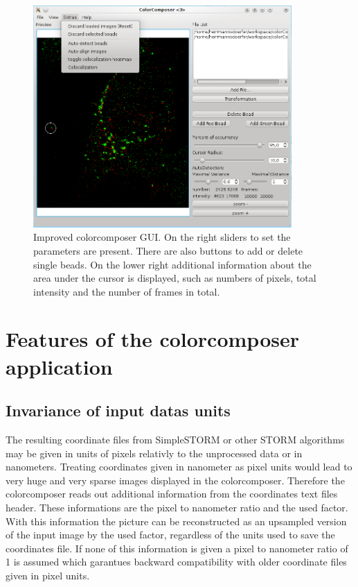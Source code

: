 \begin{figure}
\centering
\includegraphics[width = 0.88\textwidth]{pictures/GuiColorcomposer/BeforeAlignmentWithMenu.png}
\caption{Improved colorcomposer GUI. On the right sliders to set the parameters are present. There are also buttons to add or delete single beads. On the lower right additional information about the area under the cursor is displayed, such as numbers of pixels, total intensity and the number of frames in total.}
\label{ColorComposer}
\end{figure}


\section{Features of the colorcomposer application}
\subsection{Invariance of input datas units}
The resulting coordinate files from SimpleSTORM or other STORM algorithms may be given in units of pixels relativly to the unprocessed data or in nanometers. Treating coordinates given in nanometer as pixel units would lead to very huge and very sparse images displayed in the colorcomposer. Therefore the colorcomposer reads out additional information from the coordinates text files header. These informations are the pixel to nanometer ratio and the used factor. With this information the picture can be reconstructed as an upsampled version of the input image by the used factor, regardless of the units used to save the coordinates file. If none of this information is given a pixel to nanometer ratio of 1 is assumed which garantues backward compatibility with older coordinate files given in pixel units.
